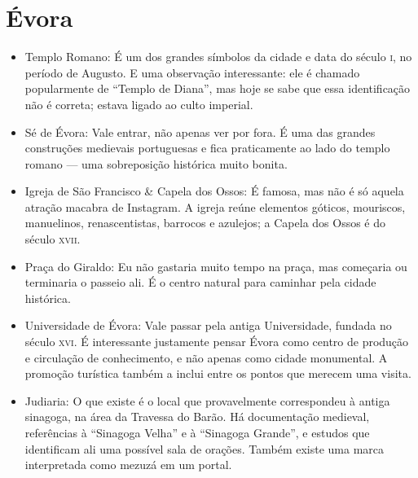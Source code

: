 \chapter{Évora}

\begin{itemize}
\item Templo Romano: É um dos grandes símbolos da cidade e data do século \textsc{i}, no período de Augusto. E uma observação interessante: ele é chamado popularmente de ``Templo de Diana'', mas hoje se sabe que essa identificação não é correta; estava ligado ao culto imperial.

\item Sé de Évora: Vale entrar, não apenas ver por fora. É uma das grandes construções medievais portuguesas e fica praticamente ao lado do templo romano --- uma sobreposição histórica muito bonita.

\item Igreja de São Francisco \& Capela dos Ossos: É famosa, mas não é só aquela atração macabra de Instagram. A igreja reúne elementos góticos, mouriscos, manuelinos, renascentistas, barrocos e azulejos; a Capela dos Ossos é do século \textsc{xvii}.

\item Praça do Giraldo: Eu não gastaria muito tempo na praça, mas começaria ou terminaria o passeio ali. É o centro natural para caminhar pela cidade histórica.

\item Universidade de Évora: Vale passar pela antiga Universidade, fundada no século \textsc{xvi}. É interessante justamente pensar Évora como centro de produção e circulação de conhecimento, e não apenas como cidade monumental. A promoção turística também a inclui entre os pontos que merecem uma visita.

\item Judiaria: O que existe é o local que provavelmente correspondeu à antiga sinagoga, na área da Travessa do Barão. Há documentação medieval, referências à ``Sinagoga Velha'' e à ``Sinagoga Grande'', e estudos que identificam ali uma possível sala de orações. Também existe uma marca interpretada como mezuzá em um portal.
\end{itemize}